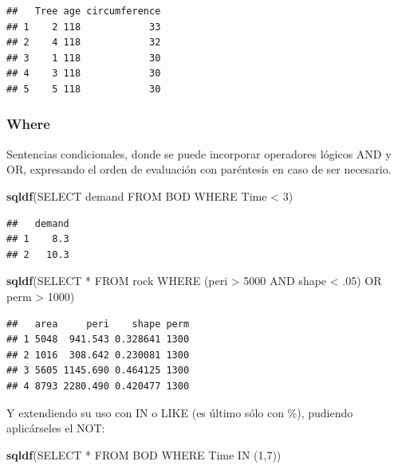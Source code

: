 \documentclass[
]{book}
\newenvironment{Shaded}{\begin{snugshade}}{\end{snugshade}}
\newcommand{\FunctionTok}[1]{\textcolor[rgb]{0.13,0.29,0.53}{\textbf{#1}}}
\newcommand{\NormalTok}[1]{#1}
\newcommand{\StringTok}[1]{\textcolor[rgb]{0.31,0.60,0.02}{#1}}
\begin{document}
\begin{verbatim}
##   Tree age circumference
## 1    2 118            33
## 2    4 118            32
## 3    1 118            30
## 4    3 118            30
## 5    5 118            30
\end{verbatim}

\hypertarget{where}{%
\subsubsection{Where}\label{where}}

Sentencias condicionales, donde se puede incorporar operadores lógicos AND y OR, expresando el orden de evaluación con paréntesis en caso de ser necesario.

\begin{Shaded}
\begin{Highlighting}[]
\FunctionTok{sqldf}\NormalTok{(}\StringTok{\textquotesingle{}SELECT demand FROM BOD WHERE Time \textless{} 3\textquotesingle{}}\NormalTok{)}
\end{Highlighting}
\end{Shaded}

\begin{verbatim}
##   demand
## 1    8.3
## 2   10.3
\end{verbatim}

\begin{Shaded}
\begin{Highlighting}[]
\FunctionTok{sqldf}\NormalTok{(}\StringTok{\textquotesingle{}SELECT * FROM rock WHERE (peri \textgreater{} 5000 AND shape \textless{} .05) OR perm \textgreater{} 1000\textquotesingle{}}\NormalTok{)}
\end{Highlighting}
\end{Shaded}

\begin{verbatim}
##   area     peri    shape perm
## 1 5048  941.543 0.328641 1300
## 2 1016  308.642 0.230081 1300
## 3 5605 1145.690 0.464125 1300
## 4 8793 2280.490 0.420477 1300
\end{verbatim}

Y extendiendo su uso con IN o LIKE (es último sólo con \%), pudiendo aplicárseles el NOT:

\begin{Shaded}
\begin{Highlighting}[]
\FunctionTok{sqldf}\NormalTok{(}\StringTok{\textquotesingle{}SELECT * FROM BOD WHERE Time IN (1,7)\textquotesingle{}}\NormalTok{)}
\end{Highlighting}
\end{Shaded}
\end{document}
